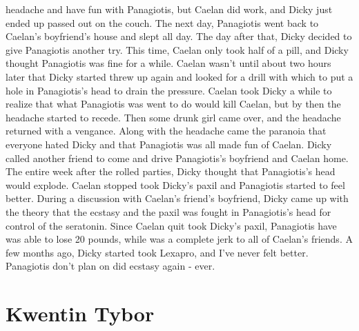 \documentclass[12pt]{book}
\begin{document}
headache and have fun with Panagiotis, but Caelan did work, and Dicky just ended up passed out on the couch. The next day, Panagiotis went back to Caelan's boyfriend's house and slept all day. The day after that, Dicky decided to give Panagiotis another try. This time, Caelan only took half of a pill, and Dicky thought Panagiotis was fine for a while. Caelan wasn't until about two hours later that Dicky started threw up again and looked for a drill with which to put a hole in Panagiotis's head to drain the pressure. Caelan took Dicky a while to realize that what Panagiotis was went to do would kill Caelan, but by then the headache started to recede. Then some drunk girl came over, and the headache returned with a vengance. Along with the headache came the paranoia that everyone hated Dicky and that Panagiotis was all made fun of Caelan. Dicky called another friend to come and drive Panagiotis's boyfriend and Caelan home. The entire week after the rolled parties, Dicky thought that Panagiotis's head would explode. Caelan stopped took Dicky's paxil and Panagiotis started to feel better. During a discussion with Caelan's friend's boyfriend, Dicky came up with the theory that the ecstasy and the paxil was fought in Panagiotis's head for control of the seratonin. Since Caelan quit took Dicky's paxil, Panagiotis have was able to lose 20 pounds, while was a complete jerk to all of Caelan's friends. A few months ago, Dicky started took Lexapro, and I've never felt better. Panagiotis don't plan on did ecstasy again - ever.



\chapter{Kwentin Tybor}
\end{document}
